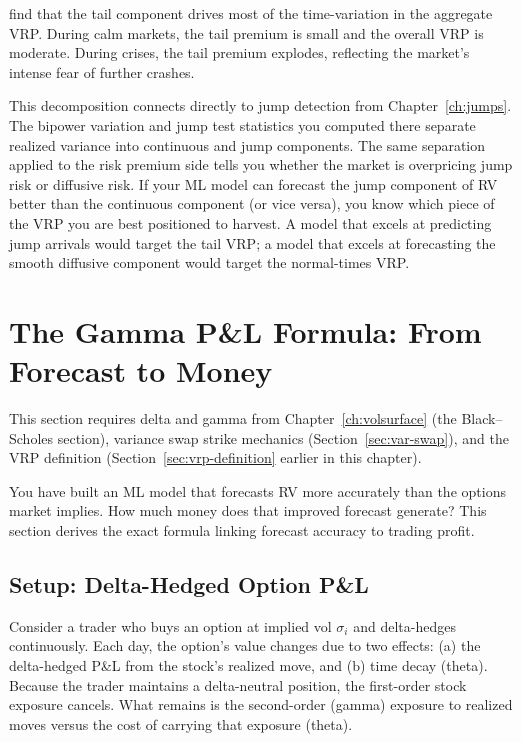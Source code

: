 \citet{BollerslevTodorov2015} find that the tail component drives most of the time-variation in the aggregate VRP.
During calm markets, the tail premium is small and the overall VRP is moderate.
During crises, the tail premium explodes, reflecting the market's intense fear of further crashes.

\begin{projectconnection}
This decomposition connects directly to jump detection from Chapter~\ref{ch:jumps}. The bipower variation and jump test statistics you computed there separate realized variance into continuous and jump components. The same separation applied to the risk premium side tells you whether the market is overpricing jump risk or diffusive risk. If your ML model can forecast the jump component of RV better than the continuous component (or vice versa), you know which piece of the VRP you are best positioned to harvest. A model that excels at predicting jump arrivals would target the tail VRP; a model that excels at forecasting the smooth diffusive component would target the normal-times VRP.
\end{projectconnection}


\section{The Gamma P\&L Formula: From Forecast to Money}
\label{sec:gamma-pnl}

\begin{prereq}
This section requires delta and gamma from Chapter~\ref{ch:volsurface} (the Black--Scholes section), variance swap strike mechanics (Section~\ref{sec:var-swap}), and the VRP definition (Section~\ref{sec:vrp-definition} earlier in this chapter).
\end{prereq}

You have built an ML model that forecasts RV more accurately than the options market implies.
How much money does that improved forecast generate?
This section derives the exact formula linking forecast accuracy to trading profit.

\subsection{Setup: Delta-Hedged Option P\&L}

Consider a trader who buys an option at implied vol $\sigma_i$ and delta-hedges continuously.
Each day, the option's value changes due to two effects: (a) the delta-hedged P\&L from the stock's realized move, and (b) time decay (theta).
Because the trader maintains a delta-neutral position, the first-order stock exposure cancels.
What remains is the second-order (gamma) exposure to realized moves versus the cost of carrying that exposure (theta).

